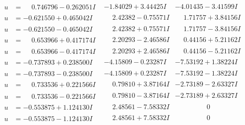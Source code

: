 \documentclass[1p]{elsarticle_modified}
\theoremstyle{definition}
\begin{document}
$$\begin{array}{c|c|c}
\begin{aligned}
u &= \phantom{-}0.746796 - 0.262051 I\end{aligned}
 & -1.84029 + 3.44425 I & -4.01435 - 3.41599 I \\ \hline\begin{aligned}
u &= -0.621550 + 0.465042 I\end{aligned}
 & \phantom{-}2.42382 - 0.75571 I & \phantom{-}1.71757 + 3.84156 I \\ \hline\begin{aligned}
u &= -0.621550 - 0.465042 I\end{aligned}
 & \phantom{-}2.42382 + 0.75571 I & \phantom{-}1.71757 - 3.84156 I \\ \hline\begin{aligned}
u &= \phantom{-}0.653966 + 0.417174 I\end{aligned}
 & \phantom{-}2.20293 - 2.46586 I & \phantom{-}0.44156 + 5.21162 I \\ \hline\begin{aligned}
u &= \phantom{-}0.653966 - 0.417174 I\end{aligned}
 & \phantom{-}2.20293 + 2.46586 I & \phantom{-}0.44156 - 5.21162 I \\ \hline\begin{aligned}
u &= -0.737893 + 0.238500 I\end{aligned}
 & -4.15809 - 0.23287 I & -7.53192 + 1.38224 I \\ \hline\begin{aligned}
u &= -0.737893 - 0.238500 I\end{aligned}
 & -4.15809 + 0.23287 I & -7.53192 - 1.38224 I \\ \hline\begin{aligned}
u &= \phantom{-}0.733536 + 0.221566 I\end{aligned}
 & \phantom{-}0.79810 + 3.87164 I & -2.73189 - 2.63327 I \\ \hline\begin{aligned}
u &= \phantom{-}0.733536 - 0.221566 I\end{aligned}
 & \phantom{-}0.79810 - 3.87164 I & -2.73189 + 2.63327 I \\ \hline\begin{aligned}
u &= -0.553875 + 1.124130 I\end{aligned}
 & \phantom{-}2.48561 - 7.58332 I & \phantom{-0.000000 } 0 \\ \hline\begin{aligned}
u &= -0.553875 - 1.124130 I\end{aligned}
 & \phantom{-}2.48561 + 7.58332 I & \phantom{-0.000000 } 0 \\ \hline\begin{aligned}

\end{aligned}
\end{array}$$
\end{document}
